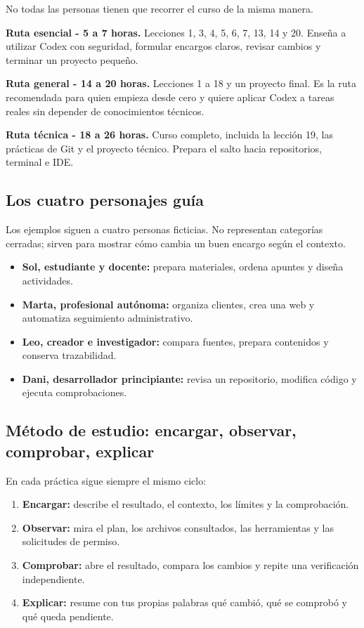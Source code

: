 \documentclass[10pt,a4paper,openany]{book}
\providecommand{\tightlist}{\setlength{\itemsep}{0.18em}\setlength{\parskip}{0pt}}
\begin{document}
No todas las personas tienen que recorrer el curso de la misma manera.

\textbf{Ruta esencial - 5 a 7 horas.} Lecciones 1, 3, 4, 5, 6, 7, 13, 14
y 20. Enseña a utilizar Codex con seguridad, formular encargos claros,
revisar cambios y terminar un proyecto pequeño.

\textbf{Ruta general - 14 a 20 horas.} Lecciones 1 a 18 y un proyecto
final. Es la ruta recomendada para quien empieza desde cero y quiere
aplicar Codex a tareas reales sin depender de conocimientos técnicos.

\textbf{Ruta técnica - 18 a 26 horas.} Curso completo, incluida la
lección 19, las prácticas de Git y el proyecto técnico. Prepara el salto
hacia repositorios, terminal e IDE.

\subsection{Los cuatro personajes
guía}\label{los-cuatro-personajes-guuxeda}

Los ejemplos siguen a cuatro personas ficticias. No representan
categorías cerradas; sirven para mostrar cómo cambia un buen encargo
según el contexto.

\begin{itemize}
\tightlist
\item
  \textbf{Sol, estudiante y docente:} prepara materiales, ordena apuntes
  y diseña actividades.
\item
  \textbf{Marta, profesional autónoma:} organiza clientes, crea una web
  y automatiza seguimiento administrativo.
\item
  \textbf{Leo, creador e investigador:} compara fuentes, prepara
  contenidos y conserva trazabilidad.
\item
  \textbf{Dani, desarrollador principiante:} revisa un repositorio,
  modifica código y ejecuta comprobaciones.
\end{itemize}

\subsection{Método de estudio: encargar, observar, comprobar,
explicar}\label{muxe9todo-de-estudio-encargar-observar-comprobar-explicar}

En cada práctica sigue siempre el mismo ciclo:

\begin{enumerate}
\def\labelenumi{\arabic{enumi}.}
\tightlist
\item
  \textbf{Encargar:} describe el resultado, el contexto, los límites y
  la comprobación.
\item
  \textbf{Observar:} mira el plan, los archivos consultados, las
  herramientas y las solicitudes de permiso.
\item
  \textbf{Comprobar:} abre el resultado, compara los cambios y repite
  una verificación independiente.
\item
  \textbf{Explicar:} resume con tus propias palabras qué cambió, qué se
  comprobó y qué queda pendiente.
\end{enumerate}
\end{document}
